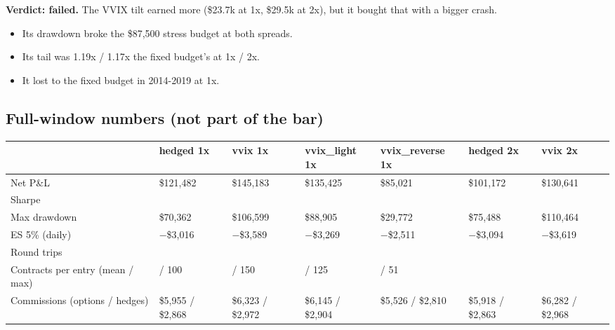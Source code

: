 \documentclass{article}
\begin{document}
\textbf{Verdict: failed.} The VVIX tilt earned more (\$23.7k at 1x, \$29.5k at 2x), but it bought that with a bigger crash.

\begin{itemize}

\item Its drawdown broke the \$87,500 stress budget at both spreads.

\item Its tail was 1.19x /\allowbreak{} 1.17x the fixed budget's at 1x /\allowbreak{} 2x.

\item It lost to the fixed budget in 2014-2019 at 1x.

\end{itemize}

\subsection{Full-window numbers (not part of the bar)}

\begin{center}\small
\begin{tabularx}{\linewidth}{>{\raggedright\arraybackslash}X >{\raggedright\arraybackslash}X >{\raggedright\arraybackslash}X >{\raggedright\arraybackslash}X >{\raggedright\arraybackslash}X >{\raggedright\arraybackslash}X >{\raggedright\arraybackslash}X}
\toprule
\textbf{} & \textbf{hedged 1x} & \textbf{vvix 1x} & \textbf{vvix\_light 1x} & \textbf{vvix\_reverse 1x} & \textbf{hedged 2x} & \textbf{vvix 2x} \\
\midrule
Net P\&L & \$121,482 & \$145,183 & \$135,425 & \$85,021 & \$101,172 & \$130,641 \\
Sharpe & 0.52 & 0.44 & 0.48 & 0.55 & 0.43 & 0.40 \\
Max drawdown & \$70,362 & \$106,599 & \$88,905 & \$29,772 & \$75,488 & \$110,464 \\
ES 5\% (daily) & \ensuremath{-}\$3,016 & \ensuremath{-}\$3,589 & \ensuremath{-}\$3,269 & \ensuremath{-}\$2,511 & \ensuremath{-}\$3,094 & \ensuremath{-}\$3,619 \\
Round trips & 182 & 181 & 182 & 182 & 181 & 180 \\
Contracts per entry (mean /\allowbreak{} max) & 25.4 /\allowbreak{} 100 & 27.1 /\allowbreak{} 150 & 26.2 /\allowbreak{} 125 & 23.6 /\allowbreak{} 51 &  &  \\
Commissions (options /\allowbreak{} hedges) & \$5,955 /\allowbreak{} \$2,868 & \$6,323 /\allowbreak{} \$2,972 & \$6,145 /\allowbreak{} \$2,904 & \$5,526 /\allowbreak{} \$2,810 & \$5,918 /\allowbreak{} \$2,863 & \$6,282 /\allowbreak{} \$2,968 \\
\bottomrule
\end{tabularx}
\end{center}
\end{document}
